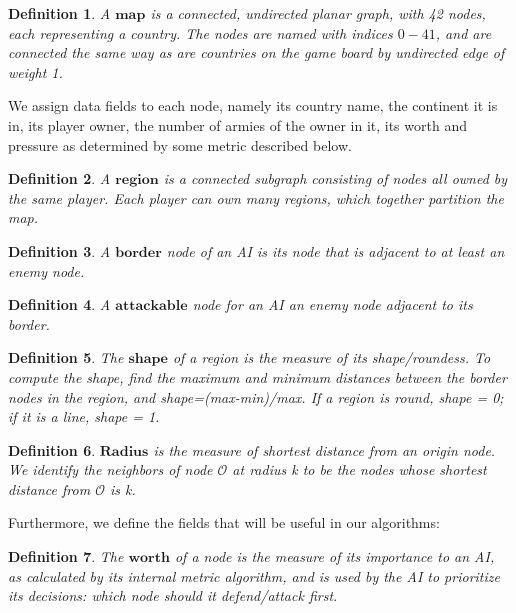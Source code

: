 \documentclass[12pt]{article}  %
\newtheorem{definition}{Definition}
\begin{document}
\begin{definition} \label{map}
A $\textbf{map}$ is a connected, undirected planar graph, with 42 nodes, each representing a country. The nodes are named with indices $0-41$, and are connected the same way as are countries on the game board by undirected edge of weight 1.
\end{definition}

We assign data fields to each node, namely its country name, the continent it is in, its player owner, the number of armies of the owner in it, its worth and pressure as determined by some metric described below.


\begin{definition} \label{region}
A $\textbf{region}$ is a connected subgraph consisting of nodes all owned by the same player. Each player can own many regions, which together partition the map.
\end{definition}

\begin{definition} \label{border}
A $\textbf{border}$ node of an AI is its node that is adjacent to at least an enemy node.
\end{definition}

\begin{definition} \label{attackable}
A $\textbf{attackable}$ node for an AI an enemy node adjacent to its border.
\end{definition}

\begin{definition} \label{shape}
The $\textbf{shape}$ of a region is the measure of its shape/roundess. To compute the shape, find the maximum and minimum distances between the border nodes in the region, and shape=(max-min)/max. If a region is round, shape = 0; if it is a line, shape = 1.
\end{definition}

\begin{definition} \label{radius}
$\textbf{Radius}$ is the measure of shortest distance from an origin node. We identify the neighbors of node $\mathcal{O}$ at radius k to be the nodes whose shortest distance from $\mathcal{O}$ is k.
\end{definition}


Furthermore, we define the fields that will be useful in our algorithms:

\begin{definition} \label{worth}
The $\textbf{worth}$ of a node is the measure of its importance to an AI, as calculated by its internal metric algorithm, and is used by the AI to prioritize its decisions: which node should it defend/attack first.
\end{definition}
\end{document}

